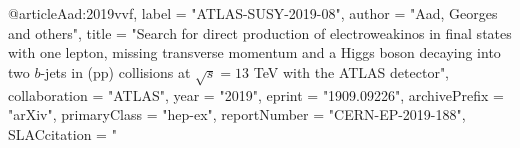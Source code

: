 @article{Aad:2019vvf,
      label          = "ATLAS-SUSY-2019-08",
      author         = "Aad, Georges and others",
      title          = "{Search for direct production of electroweakinos in final
                        states with one lepton, missing transverse momentum and a
                        Higgs boson decaying into two $b$-jets in (pp) collisions
                        at $\sqrt{s}=13$ TeV with the ATLAS detector}",
      collaboration  = "ATLAS",
      year           = "2019",
      eprint         = "1909.09226",
      archivePrefix  = "arXiv",
      primaryClass   = "hep-ex",
      reportNumber   = "CERN-EP-2019-188",
      SLACcitation   = "%
}

